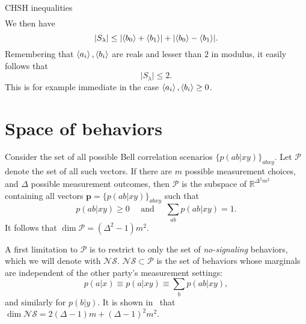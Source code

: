 \documentclass[12pt]{report}
\newcommand{\RR}{\mathbb{R}}
\begin{document}
\begin{depthbox}[]{CHSH inequalities}
\begin{equation}
\begin{aligned}
    \end{aligned}
    \end{equation}
    We then have
    \begin{equation}
        |S_\lambda| \le \lvert\expval{b_0} + \expval{b_1}\rvert
                      + \lvert\expval{b_0} - \expval{b_1}\rvert.
    \end{equation}
    Remembering that $\expval{a_i},\expval{b_i}$ are reals and lesser than $2$ in modulus, it easily follows that
    \begin{equation}
        \lvert S_\lambda\rvert \le 2.
    \end{equation}
    This is for example immediate in the case $\expval{a_i},\expval{b_i}\ge 0$.
\end{depthbox}

\section{Space of behaviors}
\newcommand{\NS}{\mathcal{N}\mathcal{S}}

Consider the set of all possible Bell correlation scenarios $\{p(ab|xy)\}_{abxy}$.
Let $\mathcal P$ denote the set of all such vectors.
If there are $m$ possible measurement choices, and $\Delta$ possible measurement outcomes, then $\mathcal P$ is the subspace of $\RR^{\Delta^2 m^2}$ containing all vectors $\mathbf p=\{p(ab|xy)\}_{abxy}$ such that
\begin{equation}
    p(ab|xy)\ge0\quad\text{ and }\quad \sum_{ab}p(ab|xy)=1.
\end{equation}
It follows that $\dim\mathcal P=(\Delta^2-1)m^2$.

A first limitation to $\mathcal P$ is to restrict to only the set of \emph{no-signaling} behaviors, which we will denote with $\NS$.
$\NS\subset\mathcal P$ is the set of behaviors whose marginals are independent of the other party's measurement settings:
\begin{equation}
    p(a|x)\equiv p(a|xy)\equiv\sum_b p(ab|xy),
\end{equation}
and similarly for $p(b|y)$.
It is shown in~\autocite{pironio2005lifting} that $\dim\NS=2(\Delta-1)m+(\Delta-1)^2m^2$.
\end{document}
